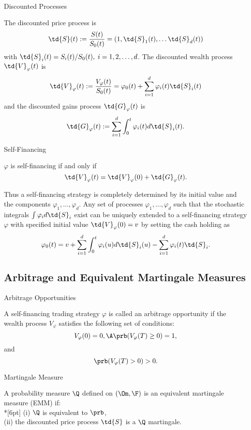 { Discounted Processes}

The discounted price process is
$$
\td{S}(t) := \frac{S(t)}{S_0(t)} = (1, \td{S}_1(t), \ldots
\td{S}_d(t))
$$
with $\td{S}_i(t) = S_i(t)/S_0(t),\; i=1,2, \ldots, d$. The
discounted wealth process $\td{V}_\varphi(t)$ is
$$
\td{V}_\varphi(t):= \frac{V_\varphi(t)}{S_0(t)} = \varphi_0(t) +
\sum_{i=1}^d \varphi_i(t) \td{S}_i(t)
$$
and the discounted gains process $\td{G}_\varphi(t)$ is
$$
\td{G}_\varphi(t) := \sum_{i=1}^d \int_0^t \varphi_i(t)
d\td{S}_i(t).
$$

{ Self-Financing}

$\varphi$ is self-financing if and only if
$$
\td{V}_\varphi(t) = \td{V}_\varphi(0) + \td{G}_\varphi(t).
$$

Thus a self-financing strategy is completely determined by its
initial value and the components $\varphi_1, \ldots, \varphi_d$.
Any set of processes $\varphi_1, \ldots, \varphi_d$
such that the stochastic integrals $\int \varphi_i d\td{S}_i$
exist can be uniquely extended to a self-financing strategy
$\varphi$ with specified initial value $\td{V}_\varphi(0)= v$ by
setting the cash holding as
$$
\varphi_0(t) = v + \sum_{i=1}^d \int_0^t \varphi_i(u) d\td{S}_i(u)
- \sum_{i=1}^d \varphi_i(t) \td{S}_i.
$$

\subsection{Arbitrage and Equivalent Martingale Measures}

{ Arbitrage Opportunities}

A self-financing trading strategy $\varphi$ is called an arbitrage
opportunity if the wealth process $V_\varphi$ satisfies the
following set of conditions:
$$
V_\varphi(0)=0,\A \prb(V_\varphi(T) \geq 0) =1,
$$
and
$$
\prb(V_\varphi(T) > 0) >0.
$$


{ Martingale Measure}

A probability measure $\Q$ defined on $(\Om,\F)$ is an equivalent
martingale measure (EMM) if:\\*[6pt]
(i) $\Q$ is equivalent to $\prb$,\\
(ii) the discounted price process $\td{S}$ is a $\Q$ martingale.

